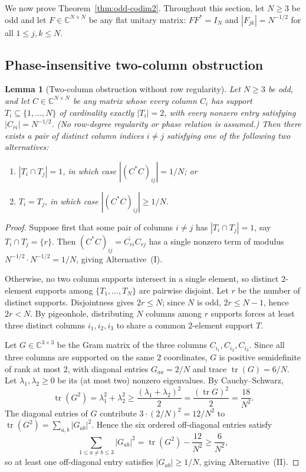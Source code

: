 \documentclass[11pt,reqno]{amsart}
\numberwithin{equation}{section}
\newtheorem{lemma}[theorem]{Lemma}
\theoremstyle{definition}
\theoremstyle{remark}
\newcommand{\C}{\mathbb{C}}
\newcommand{\tr}{\operatorname{tr}}
\begin{document}
We now prove Theorem~\ref{thm:odd-codim2}. Throughout this section, let $N\ge 3$ be odd and let $F\in\C^{N\times N}$ be any flat unitary matrix: $FF^*=I_N$ and $|F_{jk}|=N^{-1/2}$ for all $1\le j,k\le N$.

\subsection{Phase-insensitive two-column obstruction}

\begin{lemma}[Two-column obstruction without row regularity]
\label{lem:two-col}
Let $N\ge 3$ be odd, and let $C\in\C^{N\times N}$ be any matrix whose every column $C_i$ has support $T_i\subseteq\{1,\ldots,N\}$ of cardinality exactly $|T_i|=2$, with every nonzero entry satisfying $|C_{ri}|=N^{-1/2}$. (No row-degree regularity or phase relation is assumed.) Then there exists a pair of distinct column indices $i\neq j$ satisfying one of the following two alternatives:
\begin{enumerate}[label=(\Roman*),leftmargin=2.4em]
\item $|T_i\cap T_j|=1$, in which case $|(C^*C)_{ij}| = 1/N$; or
\item $T_i = T_j$, in which case $|(C^*C)_{ij}| \ge 1/N$.
\end{enumerate}
\end{lemma}

\begin{proof}
Suppose first that some pair of columns $i\neq j$ has $|T_i\cap T_j|=1$, say $T_i\cap T_j=\{r\}$. Then $(C^*C)_{ij} = \overline{C_{ri}}C_{rj}$ has a single nonzero term of modulus $N^{-1/2}\cdot N^{-1/2}=1/N$, giving Alternative~(I).

Otherwise, no two column supports intersect in a single element, so distinct $2$-element supports among $\{T_1,\ldots,T_N\}$ are pairwise disjoint. Let $r$ be the number of distinct supports. Disjointness gives $2r\le N$; since $N$ is odd, $2r\le N-1$, hence $2r<N$. By pigeonhole, distributing $N$ columns among $r$ supports forces at least three distinct columns $i_1,i_2,i_3$ to share a common $2$-element support $T$.

Let $G\in\C^{3\times 3}$ be the Gram matrix of the three columns $C_{i_1},C_{i_2},C_{i_3}$. Since all three columns are supported on the same $2$ coordinates, $G$ is positive semidefinite of rank at most $2$, with diagonal entries $G_{aa}=2/N$ and trace $\tr(G)=6/N$. Let $\lambda_1,\lambda_2\ge 0$ be its (at most two) nonzero eigenvalues. By Cauchy--Schwarz,
\[
\tr(G^2) = \lambda_1^2 + \lambda_2^2 \ge \frac{(\lambda_1+\lambda_2)^2}{2} = \frac{(\tr G)^2}{2} = \frac{18}{N^2}.
\]
The diagonal entries of $G$ contribute $3\cdot(2/N)^2 = 12/N^2$ to $\tr(G^2) = \sum_{a,b}|G_{ab}|^2$. Hence the six ordered off-diagonal entries satisfy
\[
\sum_{1\le a\neq b\le 3} |G_{ab}|^2 = \tr(G^2) - \frac{12}{N^2} \ge \frac{6}{N^2},
\]
so at least one off-diagonal entry satisfies $|G_{ab}|\ge 1/N$, giving Alternative~(II).
\end{proof}
\end{document}
